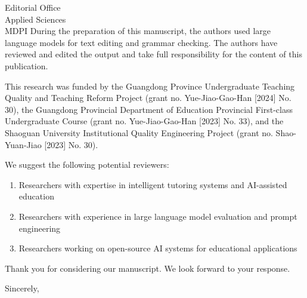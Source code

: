 \documentclass[11pt]{letter}
\begin{document}
\begin{letter}{Editorial Office\\Applied Sciences\\MDPI}
During the preparation of this manuscript, the authors used large language models for text editing and grammar checking. The authors have reviewed and edited the output and take full responsibility for the content of this publication.

This research was funded by the Guangdong Province Undergraduate Teaching Quality and Teaching Reform Project (grant no. Yue-Jiao-Gao-Han [2024] No. 30), the Guangdong Provincial Department of Education Provincial First-class Undergraduate Course (grant no. Yue-Jiao-Gao-Han [2023] No. 33), and the Shaoguan University Institutional Quality Engineering Project (grant no. Shao-Yuan-Jiao [2023] No. 30).

We suggest the following potential reviewers:
\begin{enumerate}
    \item Researchers with expertise in intelligent tutoring systems and AI-assisted education
    \item Researchers with experience in large language model evaluation and prompt engineering
    \item Researchers working on open-source AI systems for educational applications
\end{enumerate}

Thank you for considering our manuscript. We look forward to your response.

\closing{Sincerely,}

\end{letter}
\end{document}
